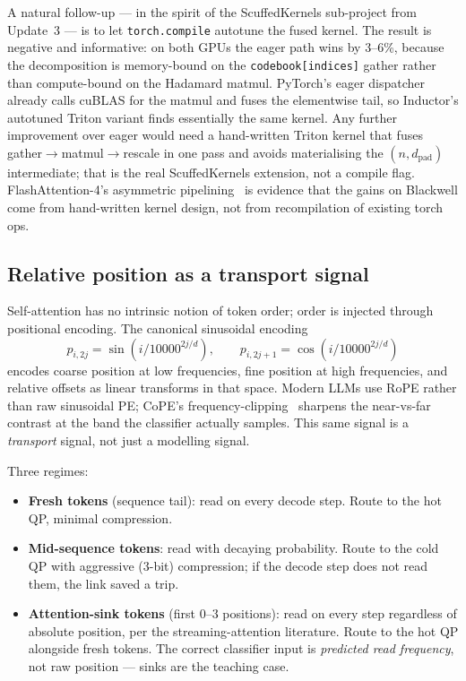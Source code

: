 \documentclass[11pt,letterpaper]{article}
\theoremstyle{definition}
\begin{document}
A natural follow-up --- in the spirit of the ScuffedKernels
sub-project from Update~3 --- is to let \texttt{torch.compile}
autotune the fused kernel. The result is negative and informative:
on both GPUs the eager path wins by 3--6\%, because the decomposition
is memory-bound on the \texttt{codebook[indices]} gather rather than
compute-bound on the Hadamard matmul. PyTorch's eager dispatcher
already calls cuBLAS for the matmul and fuses the elementwise tail,
so Inductor's autotuned Triton variant finds essentially the same
kernel. Any further improvement over eager would need a hand-written
Triton kernel that fuses gather$\to$matmul$\to$rescale in one pass
and avoids materialising the $(n, d_{\text{pad}})$ intermediate;
that is the real ScuffedKernels extension, not a compile flag.
FlashAttention-4's asymmetric pipelining~\cite{zadouri2026flashattention4}
is evidence that the gains on Blackwell come from hand-written kernel
design, not from recompilation of existing torch ops.

\subsection{Relative position as a transport signal}
\label{sec:pos-as-signal}

Self-attention has no intrinsic notion of token order; order is
injected through positional encoding. The canonical sinusoidal
encoding~\cite{zhang2023d2l}
\[
  p_{i,2j} = \sin(i/10000^{2j/d}), \qquad
  p_{i,2j+1} = \cos(i/10000^{2j/d})
\]
encodes coarse position at low frequencies, fine position at high
frequencies, and relative offsets as linear transforms in that
space. Modern LLMs use RoPE rather than raw sinusoidal PE; CoPE's
frequency-clipping~\cite{li2026cope} sharpens the near-vs-far
contrast at the band the classifier actually samples. This same
signal is a \emph{transport} signal, not just a modelling signal.

Three regimes:
\begin{itemize}
\item \textbf{Fresh tokens} (sequence tail): read on every decode
step. Route to the hot QP, minimal compression.
\item \textbf{Mid-sequence tokens}: read with decaying probability.
Route to the cold QP with aggressive (3-bit) compression; if the
decode step does not read them, the link saved a trip.
\item \textbf{Attention-sink tokens} (first 0--3 positions): read on
every step regardless of absolute position, per the streaming-attention
literature. Route to the hot QP alongside fresh tokens. The
correct classifier input is \emph{predicted read frequency}, not raw
position --- sinks are the teaching case.
\end{itemize}
\end{document}
